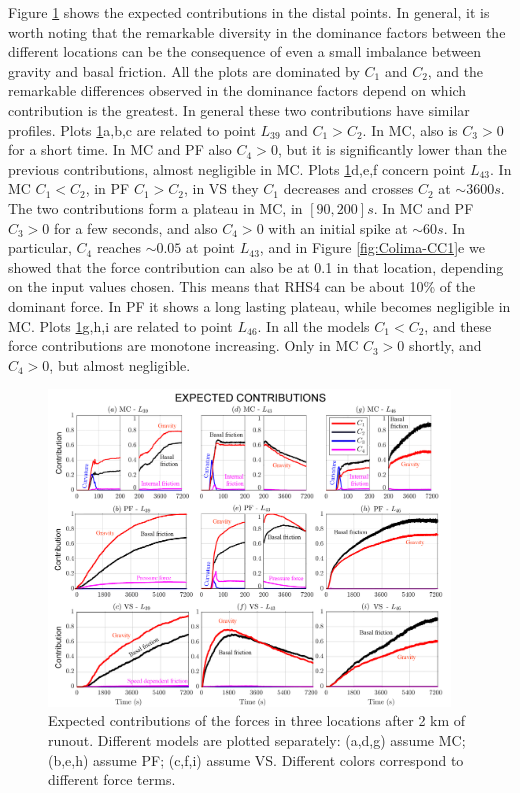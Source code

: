 \documentclass{article}
\begin{document}
Figure \ref{fig:Colima-Ci_2} shows the expected contributions in the distal points. In general, it is worth noting that the remarkable diversity in the dominance factors between the different locations can be the consequence of even a small imbalance between gravity and basal friction. All the plots are dominated by $C_1$ and $C_2$, and the remarkable differences observed in the dominance factors depend on which contribution is the greatest. In general these two contributions have similar profiles. Plots \ref{fig:Colima-Ci_2}a,b,c are related to point $L_{39}$ and $C_1>C_2$. In MC, also is $C_3>0$ for a short time. In MC and PF also $C_4>0$, but it is significantly lower than the previous contributions, almost negligible in MC. Plots \ref{fig:Colima-Ci_2}d,e,f concern point $L_{43}$. In MC $C_1<C_2$, in PF $C_1>C_2$, in VS they $C_1$ decreases and crosses $C_2$ at $\sim 3600 s$. The two contributions form a plateau in MC, in $[90, 200] s$. In MC and PF $C_3>0$ for a few seconds, and also $C_4>0$ with an initial spike at $\sim 60s$. In particular, $C_4$ reaches $\sim 0.05$ at point $L_{43}$, and in Figure \ref{fig:Colima-CC1}e we showed that the force contribution can also be at 0.1 in that location, depending on the input values chosen. This means that RHS4 can be about 10\% of the dominant force. In PF it shows a long lasting plateau, while becomes negligible in MC. Plots \ref{fig:Colima-Ci_2}g,h,i are related to point $L_{46}$. In all the models $C_1<C_2$, and these force contributions are monotone increasing. Only in MC $C_3>0$ shortly, and $C_4>0$, but almost negligible.
\begin{figure}[H]
         \centering
        \includegraphics[width=0.95\textwidth]{Ci2_total.png}
        \caption{Expected contributions of the forces in three locations after 2 km of runout. Different models are plotted separately: (a,d,g) assume MC; (b,e,h) assume PF; (c,f,i) assume VS. Different colors correspond to different force terms.}
        \label{fig:Colima-Ci_2}
\end{figure}
\end{document}
